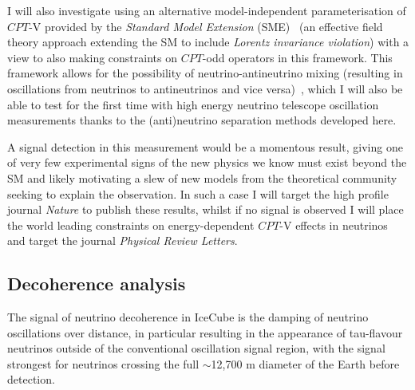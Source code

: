 \documentclass[a4paper,11pt]{article}
\newcounter{bar}
\begin{document}
I will also investigate using an alternative model-independent parameterisation of $CPT$-V provided by the \textit{Standard Model Extension} (SME)~\cite{Kostelecky:2011gq} (an effective field theory approach extending the SM to include \textit{Lorentz invariance violation}) with a view to also making constraints on $CPT$-odd operators in this framework. This framework allows for the possibility of neutrino-antineutrino mixing (resulting in oscillations from neutrinos to antineutrinos and vice versa)~\cite{Mufson:2013yia}, which I will also be able to test for the first time with high energy neutrino telescope oscillation measurements thanks to the (anti)neutrino separation methods developed here.
 
A signal detection in this measurement would be a momentous result, giving one of very few experimental signs of the new physics we know must exist beyond the SM and likely motivating a slew of new models from the theoretical community seeking to explain the observation. In such a case I will target the high profile journal \textit{Nature} to publish these results, whilst if no signal is observed I will place the world leading constraints on energy-dependent $CPT$-V effects in neutrinos and target the journal \textit{Physical Review Letters}.\\

\subsection{Decoherence analysis}



The signal of neutrino decoherence in IceCube is the damping of neutrino oscillations over distance, in particular resulting in the appearance of tau-flavour neutrinos outside of the conventional oscillation signal region, with the signal strongest for neutrinos crossing the full $\sim$12,700 m diameter of the Earth before detection. 
\end{document}
